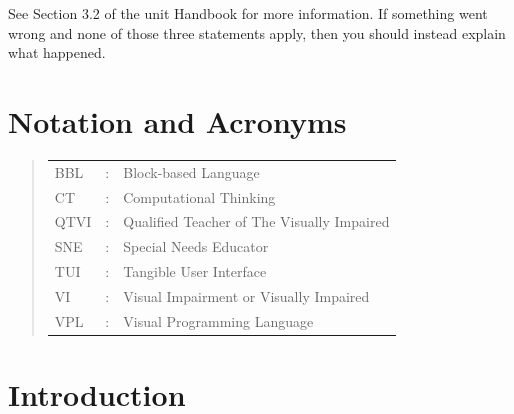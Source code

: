 \documentclass[oneside,%
                    author={Malak Hajji},
                    degree={BSc},
                    title={Designing An Accessible Ozobot Programming Platform for Students},
                  subtitle={With Mixed Visual Abilities}]{dissertation}
\begin{document}
See Section 3.2 of the unit Handbook for more information. If something went wrong and none of those three statements apply, then you should instead explain what happened.









\chapter*{Notation and Acronyms}

\vspace{1cm} 

\noindent


\begin{quote}
\noindent
\begin{tabular}{lcl}

BBL                 &:     &Block-based Language                                     \\
CT                 &:     & Computational Thinking                                        \\
QTVI                 &:     &Qualified Teacher of The Visually Impaired                                     \\
SNE                 &:     &Special Needs Educator                                     \\
TUI                 &:     & Tangible User Interface                                        \\
VI                 &:     &Visual Impairment or Visually Impaired                                   \\
VPL                 &:     &Visual Programming Language                                    \\

\end{tabular}
\end{quote}


\mainmatter

\chapter{Introduction}
\label{chap:introduction}
\end{document}
